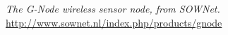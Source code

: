 \begin{thebibliography}{99}
  \textit{The G-Node wireless sensor node, from SOWNet.} \\
  \url{http://www.sownet.nl/index.php/products/gnode}
%
%
%
%
%
%
%
%
%
%
%

\end{thebibliography}
